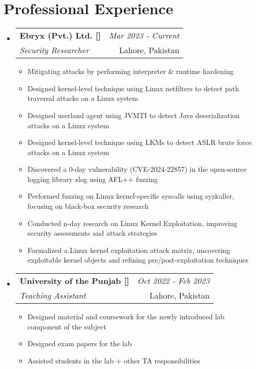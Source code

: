 \documentclass[a4paper,11pt]{article}
\makeatletter
\newcommand{\resumeSubheading}[4]{
\vspace{0.5mm}\item
    \begin{tabular*}{0.98\textwidth}[t]{l@{\extracolsep{\fill}}r}
        \textbf{#1} & \textit{\footnotesize{#4}} \\
        \textit{\footnotesize{#3}} &  \footnotesize{#2}\\
    \end{tabular*}
    \vspace{-2.4mm}
}
\newcommand{\resumeSubHeadingListStart}{\begin{itemize}[leftmargin=*,labelsep=1mm]}
\newcommand{\resumeItemListStart}{\begin{itemize}[leftmargin=*,labelsep=1mm,itemsep=0.5mm]}
\newcommand{\resumeSubHeadingListEnd}{\end{itemize}\vspace{2mm}}
\newcommand{\resumeItemListEnd}{\end{itemize}\vspace{-2mm}}
\makeatother
\begin{document}
\section{\textbf{Professional Experience}}
\vspace{-0.4mm}
  \resumeSubHeadingListStart
  \resumeSubheading
      {{Ebryx (Pvt.) Ltd. [\href{https://www.ebryx.com}{\faIcon{globe}}]}}{Lahore, Pakistan}
      {Security Researcher}{Mar 2023 - Current}
      \resumeItemListStart
        \item Mitigating attacks by performing interpreter \& runtime hardening
        \item Designed kernel-level technique using Linux netfilters to detect path traversal attacks on a Linux system
        \item Designed userland agent using JVMTI to detect Java deserialization attacks on a Linux system
        \item Designed kernel-level technique using LKMs to detect ASLR brute force attacks on a Linux system
        \item Discovered a 0-day vulnerability (CVE-2024-22857) in the open-source logging library zlog using AFL++ fuzzing
        \item Performed fuzzing on Linux kernel-specific syscalls using syzkaller, focusing on black-box security research
        \item Conducted n-day research on Linux Kernel Exploitation, improving security assessments and attack strategies
        \item Formalized a Linux kernel exploitation attack matrix, uncovering exploitable kernel objects and refining pre/post-exploitation techniques
      \resumeItemListEnd
  \resumeSubheading
    {University of the Punjab [\href{https://www.pu.edu.pk}{\faIcon{globe}}]}{Lahore, Pakistan}
    {Teaching Assistant}{Oct 2022 - Feb 2023}
    \resumeItemListStart
      \item Designed material and coursework for the newly introduced lab component of the subject
      \item Designed exam papers for the lab
      \item Assisted students in the lab + other TA responsibilities
    \resumeItemListEnd
  \resumeSubHeadingListEnd
\vspace{-6mm}
\end{document}
